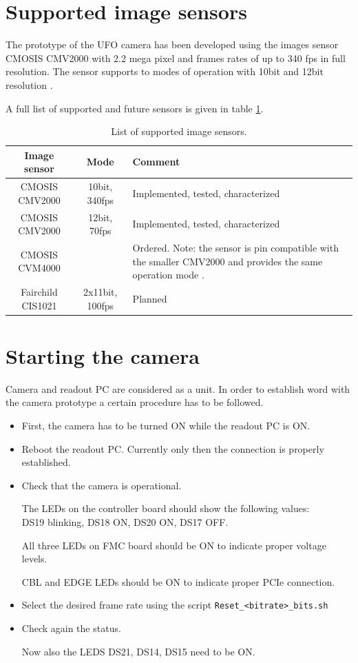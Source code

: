 \section{Supported image sensors}

The prototype of the UFO camera has been developed using the images sensor CMOSIS CMV2000 with 2.2 mega pixel and frames rates of up to 340 fps in full resolution. The sensor supports to modes of operation with 10bit and 12bit resolution \cite{CMOSIS:CMV2000}. 

A full list of supported and future sensors is given in table \ref{image-sensors}.



\begin{table}
\caption{\label{image-sensors} List of supported image sensors.}
\begin{center}
\begin{tabular}{|c|c|p{8cm}|}
\hline
Image sensor 			&  Mode 		& Comment \\
\hline
CMOSIS CMV2000 		& 10bit, 340fps & Implemented, tested, characterized \\
\hline
CMOSIS CMV2000		& 12bit, 70fps	& Implemented, tested, characterized \\
\hline
CMOSIS CVM4000		& 			& Ordered. Note: the sensor is pin compatible with the smaller CMV2000 and provides the same operation mode \cite{CMOSIS:CMV4000}. \\
\hline
Fairchild CIS1021		& 2x11bit, 100fps & Planned \cite{FAIRCHILD:CIS1021}\\
\hline
\end{tabular}
\end{center}
\end{table}


\section{Starting the camera}
Camera and readout PC are considered as a unit. In order to establish word with the camera 
prototype a certain procedure has to be followed.

\begin{itemize}
\item First, the camera has to be turned ON while the readout PC is ON.
\item Reboot the readout PC. Currently only then the connection is properly established.
\item Check that the camera is operational. 

The LEDs on the controller board should show the following values:\\
DS19 blinking, DS18 ON, DS20  ON, DS17 OFF. 

All three LEDs on FMC board should be ON to indicate proper voltage levels.

CBL and EDGE LEDs should be ON to indicate proper PCIe connection. 
\item Select the desired frame rate using the script \verb/Reset_<bitrate>_bits.sh/
\item Check again the status. 

Now also the LEDS DS21, DS14, DS15 need to be ON.
\end{itemize}


